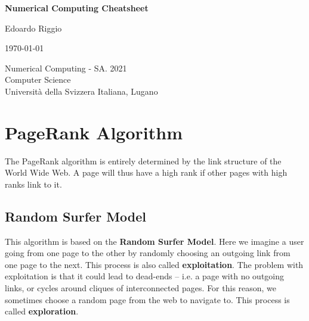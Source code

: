 \documentclass{article}
\begin{document}
\begin{titlepage}
    \begin{center}
        \vspace*{1cm}
        
        \Huge
        \textbf{Numerical Computing Cheatsheet}
        
        \vspace{0.5cm}
        \LARGE
        
        \vspace{.5cm}
        
        Edoardo Riggio
   		  \vspace{1.5cm}
       
        \vfill
        
        \today
        
        \vspace{.8cm}
          \Large
          Numerical Computing - SA. 2021 \\
        Computer Science\\
        Universit\`{a} della Svizzera Italiana, Lugano\\
        
    \end{center}
\end{titlepage}

\tableofcontents

\newpage

\section{PageRank Algorithm}
The PageRank algorithm is entirely determined by the link structure of the World Wide Web. A page will thus have a high rank if other pages with high ranks link to it.

\subsection{Random Surfer Model}
This algorithm is based on the \textbf{Random Surfer Model}. Here we imagine a user going from one page to the other by randomly choosing an outgoing link from one page to the next. This process is also called \textbf{exploitation}. The problem with exploitation is that it could lead to dead-ends -- i.e. a page with no outgoing links, or cycles around cliques of interconnected pages. For this reason, we sometimes choose a random page from the web to navigate to. This process is called \textbf{exploration}.
\end{document}

